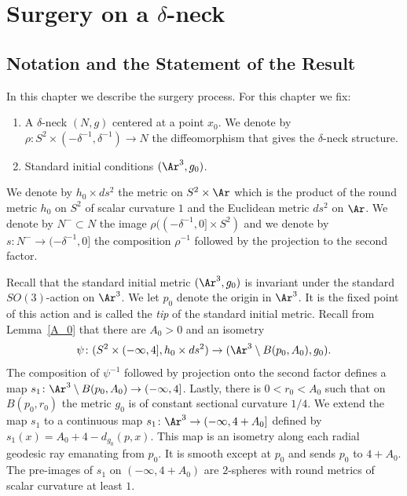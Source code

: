 \chapter{Surgery on a $\delta$-neck}
\label{chap:surgery-delta-neck}

\section{Notation and the Statement of the Result}\label{necksurgery}

In this chapter we describe the surgery process. For this chapter we
fix:

\begin{enumerate}
\item[(1)] A $\delta$-neck $(N,g)$ centered at a point $x_0$.
We denote by $\rho\colon  S^2\times (-\delta^{-1},\delta^{-1})\to N$
the diffeomorphism that gives the $\delta$-neck structure.
\item[(2)] Standard initial conditions $(\Ar^3,g_0)$.
\end{enumerate}
We denote by $h_0\times ds^2$ the metric on $S^2\times \Ar$ which is
the product of the round metric $h_0$ on $S^2$ of scalar curvature
$1$ and the Euclidean metric $ds^2$ on $\Ar$. We denote by
$N^-\subset N$ the image $\rho((-\delta^{-1},0]\times S^2)$ and we
denote by $s\colon N^-\to (-\delta^{-1},0]$ the composition
$\rho^{-1}$ followed by the projection to the second factor.


Recall that the standard initial metric $(\Ar^3,g_0)$ is invariant
under the standard $SO(3)$-action on $\Ar^3$. We let $p_0$ denote
the origin in $\Ar^3$. It is  the fixed point of this action and is
called the  {\em tip}
of the standard initial metric. Recall from Lemma~\ref{A_0} that
there are $A_0>0$ and an isometry
$$\psi\colon (S^2\times
(-\infty,4],h_0\times ds^2)\to (\Ar^3\setminus B(p_0,A_0),g_0).$$ The
composition of $\psi^{-1}$ followed by projection onto the second
factor defines a map $s_1\colon \Ar^3\setminus B(p_0,A_0)\to
(-\infty,4]$. Lastly, there is $0<r_0<A_0$ such that on $B(p_0,r_0)$
the metric $g_0$ is of constant sectional curvature $1/4$. We extend
the map $s_1$ to a continuous map $s_1\colon \Ar^3\to
(-\infty,4+A_0]$ defined by $s_1(x)=A_0+4-d_{g_0}(p,x)$.  This map
is an isometry along each radial geodesic ray emanating from $p_0$.
It is smooth except at $p_0$ and sends $p_0$ to $4+A_0$. The
pre-images of $s_1$ on $(-\infty,4+A_0)$ are $2$-spheres with round
metrics of scalar curvature at least $1$.




